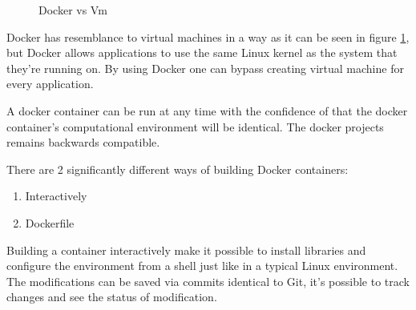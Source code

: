 \begin{figure}[h!]
    \centering
    \qquad
    \caption{Docker vs Vm}
    \label{fig:dockervm}
\end{figure}

Docker has resemblance to virtual machines in a way as it can be seen in figure \ref{fig:dockervm}, but Docker allows applications to use the same Linux kernel as the system that they’re running on. By using Docker one can bypass creating virtual machine for every application. 


A docker container can be run at any time with the confidence of that the docker container’s computational environment will be identical. The docker projects remains backwards compatible. 


There are 2 significantly different ways of building Docker containers:
\newpage
\begin{enumerate}
	\item Interactively
	\item Dockerfile
\end{enumerate} 

Building a container interactively make it possible to install libraries and configure the environment from a shell just like in a typical Linux environment. The modifications can be saved via commits identical to Git, it’s possible to track changes and see the status of modification.\\  

